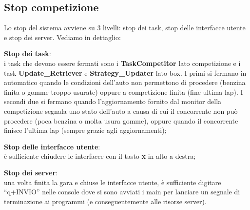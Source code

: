 \subsection{Stop competizione}
Lo stop del sistema avviene su 3 livelli: stop dei task, stop delle interfacce utente e stop dei server. Vediamo in dettaglio:
\begin{description}
\item{\textbf{Stop dei task}}:\\
i task che devono essere fermati sono i \textbf{TaskCompetitor} lato competizione e i task \textbf{Update\_Retriever} e \textbf{Strategy\_Updater} lato box.
I primi si fermano in automatico quando le condizioni dell'auto non permettono di procedere (benzina finita o gomme troppo usurate) oppure a competizione finita
(fine ultima lap). I secondi due si fermano quando l'aggiornamento fornito dal monitor della competizione segnala uno stato dell'auto a causa di cui il 
concorrente non pu\`{o} procedere (poca benzina o molta usura gomme), oppure quando il concorrente finisce l'ultima lap (sempre grazie agli aggiornamenti);
\item{\textbf{Stop delle interfacce utente}}:\\
\`{e} sufficiente chiudere le interfacce con il tasto \textbf{x} in alto a destra;
\item{\textbf{Stop dei server}}:\\
una volta finita la gara e chiuse le interfacce utente, \`{e} sufficiente digitare ``q+INVIO'' nelle console dove si sono avviati i main per lanciare un
segnale di terminazione ai programmi (e conseguentemente alle risorse server).
\end{description}